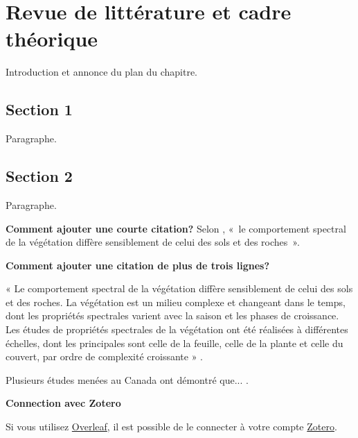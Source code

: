 \chapter{Revue de littérature et cadre théorique} \label{chap:cadretheorique}

Introduction et annonce du plan du chapitre.

\lipsum[1]

\section{Section 1} \label{sec:cadretheorique_1}

Paragraphe.
\lipsum[1] %


\section{Section 2} \label{sec:cadretheorique_2}

Paragraphe.
\lipsum[1] %

\textbf{Comment ajouter une courte citation?} Selon \textcite[69]{bonn1992precis}, «~le comportement spectral de la végétation diffère sensiblement de celui des sols et des roches~».

\textbf{Comment ajouter une citation de plus de trois lignes?}

\begin{customquote}
« Le comportement spectral de la végétation diffère sensiblement de celui des sols et des roches. La végétation est un milieu complexe et changeant dans le temps, dont les propriétés spectrales varient avec la saison et les phases de croissance. Les études de propriétés spectrales de la végétation ont été réalisées à différentes échelles, dont les principales sont celle de la feuille, celle de la plante et celle du couvert, par ordre de complexité croissante » \parencite[69]{bonn1992precis}. 
\end{customquote}

Plusieurs études menées au Canada ont démontré que... \parencite{manaugh2017overcoming,winters2011motivators}.

\textbf{Connection avec Zotero}

Si vous utilisez \href{https://www.overleaf.com}{Overleaf}, il est possible de le connecter à votre compte 
\href{https://docs.overleaf.com/integrations-and-add-ons/reference-manager-integrations/zotero}{Zotero}.

\lipsum[1-4] %